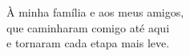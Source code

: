 \begin{dedicatoria}
  \vspace*{\fill}
  \noindent\hspace{.5\textwidth}%
  \begin{minipage}{.5\textwidth}
    \raggedright
    À minha família e aos meus amigos,\\
    que caminharam comigo até aqui\\
    e tornaram cada etapa mais leve.
  \end{minipage}
\end{dedicatoria}
